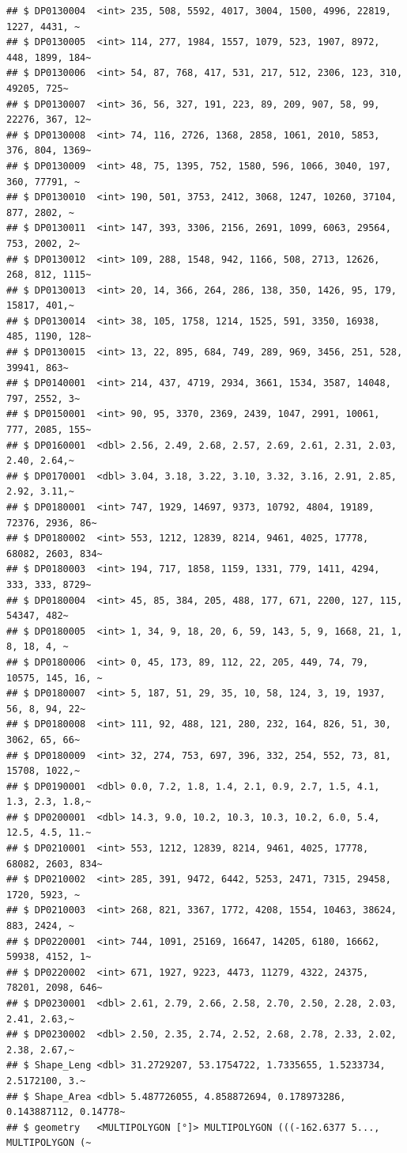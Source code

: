 \documentclass[]{article}
\begin{document}
\begin{verbatim}
## $ DP0130004  <int> 235, 508, 5592, 4017, 3004, 1500, 4996, 22819, 1227, 4431, ~
## $ DP0130005  <int> 114, 277, 1984, 1557, 1079, 523, 1907, 8972, 448, 1899, 184~
## $ DP0130006  <int> 54, 87, 768, 417, 531, 217, 512, 2306, 123, 310, 49205, 725~
## $ DP0130007  <int> 36, 56, 327, 191, 223, 89, 209, 907, 58, 99, 22276, 367, 12~
## $ DP0130008  <int> 74, 116, 2726, 1368, 2858, 1061, 2010, 5853, 376, 804, 1369~
## $ DP0130009  <int> 48, 75, 1395, 752, 1580, 596, 1066, 3040, 197, 360, 77791, ~
## $ DP0130010  <int> 190, 501, 3753, 2412, 3068, 1247, 10260, 37104, 877, 2802, ~
## $ DP0130011  <int> 147, 393, 3306, 2156, 2691, 1099, 6063, 29564, 753, 2002, 2~
## $ DP0130012  <int> 109, 288, 1548, 942, 1166, 508, 2713, 12626, 268, 812, 1115~
## $ DP0130013  <int> 20, 14, 366, 264, 286, 138, 350, 1426, 95, 179, 15817, 401,~
## $ DP0130014  <int> 38, 105, 1758, 1214, 1525, 591, 3350, 16938, 485, 1190, 128~
## $ DP0130015  <int> 13, 22, 895, 684, 749, 289, 969, 3456, 251, 528, 39941, 863~
## $ DP0140001  <int> 214, 437, 4719, 2934, 3661, 1534, 3587, 14048, 797, 2552, 3~
## $ DP0150001  <int> 90, 95, 3370, 2369, 2439, 1047, 2991, 10061, 777, 2085, 155~
## $ DP0160001  <dbl> 2.56, 2.49, 2.68, 2.57, 2.69, 2.61, 2.31, 2.03, 2.40, 2.64,~
## $ DP0170001  <dbl> 3.04, 3.18, 3.22, 3.10, 3.32, 3.16, 2.91, 2.85, 2.92, 3.11,~
## $ DP0180001  <int> 747, 1929, 14697, 9373, 10792, 4804, 19189, 72376, 2936, 86~
## $ DP0180002  <int> 553, 1212, 12839, 8214, 9461, 4025, 17778, 68082, 2603, 834~
## $ DP0180003  <int> 194, 717, 1858, 1159, 1331, 779, 1411, 4294, 333, 333, 8729~
## $ DP0180004  <int> 45, 85, 384, 205, 488, 177, 671, 2200, 127, 115, 54347, 482~
## $ DP0180005  <int> 1, 34, 9, 18, 20, 6, 59, 143, 5, 9, 1668, 21, 1, 8, 18, 4, ~
## $ DP0180006  <int> 0, 45, 173, 89, 112, 22, 205, 449, 74, 79, 10575, 145, 16, ~
## $ DP0180007  <int> 5, 187, 51, 29, 35, 10, 58, 124, 3, 19, 1937, 56, 8, 94, 22~
## $ DP0180008  <int> 111, 92, 488, 121, 280, 232, 164, 826, 51, 30, 3062, 65, 66~
## $ DP0180009  <int> 32, 274, 753, 697, 396, 332, 254, 552, 73, 81, 15708, 1022,~
## $ DP0190001  <dbl> 0.0, 7.2, 1.8, 1.4, 2.1, 0.9, 2.7, 1.5, 4.1, 1.3, 2.3, 1.8,~
## $ DP0200001  <dbl> 14.3, 9.0, 10.2, 10.3, 10.3, 10.2, 6.0, 5.4, 12.5, 4.5, 11.~
## $ DP0210001  <int> 553, 1212, 12839, 8214, 9461, 4025, 17778, 68082, 2603, 834~
## $ DP0210002  <int> 285, 391, 9472, 6442, 5253, 2471, 7315, 29458, 1720, 5923, ~
## $ DP0210003  <int> 268, 821, 3367, 1772, 4208, 1554, 10463, 38624, 883, 2424, ~
## $ DP0220001  <int> 744, 1091, 25169, 16647, 14205, 6180, 16662, 59938, 4152, 1~
## $ DP0220002  <int> 671, 1927, 9223, 4473, 11279, 4322, 24375, 78201, 2098, 646~
## $ DP0230001  <dbl> 2.61, 2.79, 2.66, 2.58, 2.70, 2.50, 2.28, 2.03, 2.41, 2.63,~
## $ DP0230002  <dbl> 2.50, 2.35, 2.74, 2.52, 2.68, 2.78, 2.33, 2.02, 2.38, 2.67,~
## $ Shape_Leng <dbl> 31.2729207, 53.1754722, 1.7335655, 1.5233734, 2.5172100, 3.~
## $ Shape_Area <dbl> 5.487726055, 4.858872694, 0.178973286, 0.143887112, 0.14778~
## $ geometry   <MULTIPOLYGON [°]> MULTIPOLYGON (((-162.6377 5..., MULTIPOLYGON (~
\end{verbatim}
\end{document}
